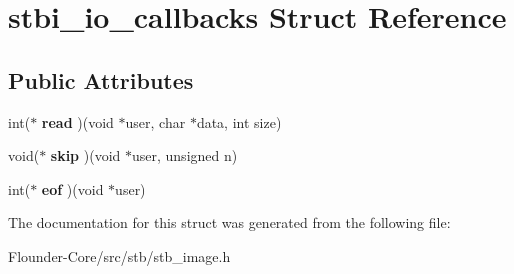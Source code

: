 \hypertarget{structstbi__io__callbacks}{}\section{stbi\+\_\+io\+\_\+callbacks Struct Reference}
\label{structstbi__io__callbacks}
\subsection*{Public Attributes}
\begin{DoxyCompactItemize}
\item 
\mbox{\label{structstbi__io__callbacks_a623e46b3a2a019611601409926283a88}} 
int($\ast$ {\bfseries read} )(void $\ast$user, char $\ast$data, int size)
\item 
\mbox{\label{structstbi__io__callbacks_aedb03a587afc3bffe28979c4e1b981bd}} 
void($\ast$ {\bfseries skip} )(void $\ast$user, unsigned n)
\item 
\mbox{\label{structstbi__io__callbacks_a319639db2f76e715eed7a7a974136832}} 
int($\ast$ {\bfseries eof} )(void $\ast$user)
\end{DoxyCompactItemize}


The documentation for this struct was generated from the following file\+:\begin{DoxyCompactItemize}
\item 
Flounder-\/\+Core/src/stb/stb\+\_\+image.\+h\end{DoxyCompactItemize}
